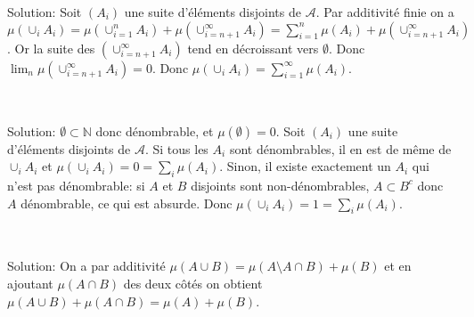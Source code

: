 \documentclass{report}
\begin{document}
Solution: Soit $(A_i)$ une suite d'éléments disjoints de $\mathcal A$. Par additivité finie on a $\mu(\cup_i A_i) = \mu(\cup_{i=1}^nA_i) +\mu(\cup_{i=n+1}^{\infty}A_i)= \sum_{i=1}^n \mu(A_i)+\mu(\cup_{i=n+1}^{\infty}A_i)$. Or la suite des $\left(\cup_{i=n+1}^{\infty}A_i\right)$ tend en décroissant vers $\emptyset$. Donc $\lim_n \mu(\cup_{i=n+1}^{\infty}A_i) =0$. Donc $\mu(\cup_i A_i)  = \sum_{i=1}^{\infty} \mu(A_i)$.

\subsection{}  \\

Solution: $\emptyset \subset \mathbb N$ donc dénombrable, et $\mu(\emptyset)=0$.\newline
Soit $(A_i)$ une suite d'éléments disjoints de $\mathcal A$. Si tous les $A_i$ sont dénombrables, il en est de même de $\cup_i A_i$ et $\mu(\cup_i A_i)=0=\sum_i \mu(A_i)$.\newline
Sinon, il existe exactement un $A_i$ qui n'est pas dénombrable: si $A$ et $B$ disjoints sont non-dénombrables, $A\subset B^c$ donc $A$ dénombrable, ce qui est absurde. Donc  $\mu(\cup_i A_i)=1=\sum_i \mu(A_i)$.

\subsection{} \\

Solution: On a par additivité $\mu(A\cup B) = \mu(A\setminus A\cap B) + \mu(B)$ et en ajoutant $\mu(A\cap B)$ des deux côtés on obtient $ \mu(A\cup B)+\mu(A\cap B)=\mu(A)+\mu(B)$.

\subsection{} 

\subsection{} 
\end{document}
